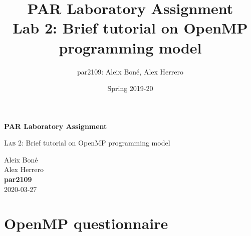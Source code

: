 

\usepackage{caption}
\usepackage{subcaption}
\usepackage{graphicx}
\usepackage{enumitem}
\usepackage{lipsum}

\usepackage{siunitx}
\usepackage{hyphenat}

\usepackage{xcolor}

\usepackage{minted}

\renewcommand\theadfont{\bfseries}

\title{
    PAR Laboratory Assignment\\
    Lab 2: Brief tutorial on OpenMP programming model
}

\author{
    par2109:
    Aleix Boné,
    Alex Herrero
}

\date{
    Spring 2019-20
}



\thispagestyle{empty}
\clearpage
\setcounter{page}{-1}

\begin{titlepage}
{
    \centering
    \null
    \vfill
    {\Huge \bfseries PAR Laboratory Assignment\par}
    \vspace{3em}
    {\Large {\scshape Lab 2:} Brief tutorial on OpenMP programming model\par}
    \vfill
\begin{center}
\end{center}
    \vspace{3cm}

    \vfill
    {\raggedleft \Large
        Aleix Boné\\
        Alex Herrero\\
        {\bfseries\ttfamily par2109}\\
        \vspace{4em}
        2020-03-27
        \par}
}
\end{titlepage}

\pagebreak


\section{OpenMP questionnaire}%
\label{sec:OpenMP questionnaire}

